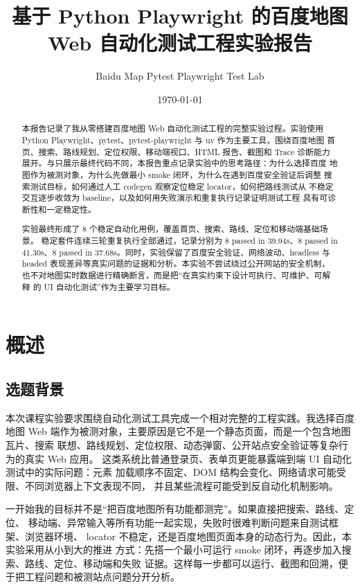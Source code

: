 \documentclass[UTF8,a4paper,12pt]{ctexart}
\title{\textbf{基于 Python Playwright 的百度地图 Web 自动化测试工程实验报告}}
\author{Baidu Map Pytest Playwright Test Lab}
\date{\today}
\begin{document}
\maketitle
\thispagestyle{empty}

\begin{abstract}
本报告记录了我从零搭建百度地图 Web 自动化测试工程的完整实验过程。实验使用
Python Playwright、pytest、pytest-playwright 与 uv 作为主要工具，围绕百度地图
首页、搜索、路线规划、定位权限、移动端视口、HTML 报告、截图和 Trace 诊断能力
展开。与只展示最终代码不同，本报告重点记录实验中的思考路径：为什么选择百度
地图作为被测对象，为什么先做最小 smoke 闭环，为什么在遇到百度安全验证后调整
搜索测试目标，如何通过人工 codegen 观察定位稳定 locator，如何把路线测试从
不稳定交互逐步收敛为 baseline，以及如何用失败演示和重复执行记录证明测试工程
具有可诊断性和一定稳定性。

实验最终形成了 8 个稳定自动化用例，覆盖首页、搜索、路线、定位和移动端基础场景。
稳定套件连续三轮重复执行全部通过，记录分别为 8 passed in 39.94s、8 passed in
41.30s、8 passed in 37.68s。同时，实验保留了百度安全验证、网络波动、headless
与 headed 表现差异等真实问题的证据和分析。本实验不尝试绕过公开网站的安全机制，
也不对地图实时数据进行精确断言，而是把“在真实约束下设计可执行、可维护、可解释
的 UI 自动化测试”作为主要学习目标。
\end{abstract}

\newpage
\tableofcontents
\newpage

\section{概述}

\subsection{选题背景}

本次课程实验要求围绕自动化测试工具完成一个相对完整的工程实践。我选择百度地图
Web 端作为被测对象，主要原因是它不是一个静态页面，而是一个包含地图瓦片、搜索
联想、路线规划、定位权限、动态弹窗、公开站点安全验证等复杂行为的真实 Web 应用。
这类系统比普通登录页、表单页更能暴露端到端 UI 自动化测试中的实际问题：元素
加载顺序不固定、DOM 结构会变化、网络请求可能受限、不同浏览器上下文表现不同，
并且某些流程可能受到反自动化机制影响。

一开始我的目标并不是“把百度地图所有功能都测完”。如果直接把搜索、路线、定位、
移动端、异常输入等所有功能一起实现，失败时很难判断问题来自测试框架、浏览器环境、
locator 不稳定，还是百度地图页面本身的动态行为。因此，本实验采用从小到大的推进
方式：先搭一个最小可运行 smoke 闭环，再逐步加入搜索、路线、定位、移动端和失败
证据。这样每一步都可以运行、截图和回溯，便于把工程问题和被测站点问题分开分析。
\end{document}
